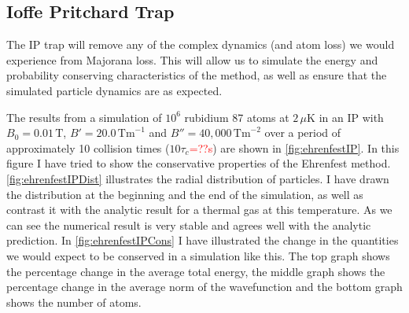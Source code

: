 \subsection{Ioffe Pritchard Trap}

The IP trap will remove any of the complex dynamics (and atom loss) we would experience from Majorana loss.
This will allow us to simulate the energy and probability conserving characteristics of the method, as well as ensure that the simulated particle dynamics are as expected.


The results from a simulation of $10^6$ rubidium 87 atoms at $2\,\mu\mathrm{K}$ in an IP with $B_0=0.01\,\mathrm{T}$, $B'=20.0\,\mathrm{Tm}^{-1}$ and $B''=40,000\,\mathrm{Tm}^{-2}$ over a period of approximately 10 collision times ($10\tau_c$\textcolor{red}{=??s}) are shown in \autoref{fig:ehrenfestIP}.
In this figure I have tried to show the conservative properties of the Ehrenfest method.
\autoref{fig:ehrenfestIPDist} illustrates the radial distribution of particles.
I have drawn the distribution at the beginning and the end of the simulation, as well as contrast it with the analytic result for a thermal gas at this temperature.
As we can see the numerical result is very stable and agrees well with the analytic prediction.
In \autoref{fig:ehrenfestIPCons} I have illustrated the change in the quantities we would expect to be conserved in a simulation like this.
The top graph shows the percentage change in the average total energy, the middle graph shows the percentage change in the average norm of the wavefunction and the bottom graph shows the number of atoms.

